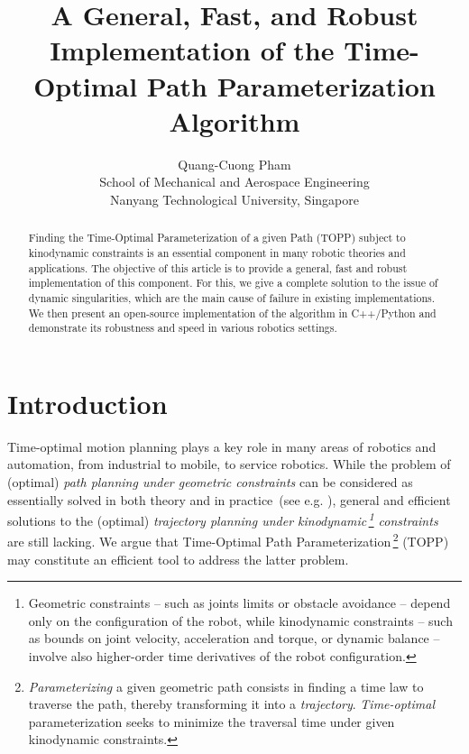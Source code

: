 \documentclass[9pt,technote]{IEEEtran}
\title{A General, Fast, and Robust Implementation of the Time-Optimal
  Path Parameterization Algorithm}
\author{Quang-Cuong Pham\\ 
  School of Mechanical and Aerospace
  Engineering\\ 
  Nanyang Technological University, Singapore}
\begin{document}
\maketitle
\thispagestyle{empty}
\pagestyle{empty}

\begin{abstract}
  Finding the Time-Optimal Parameterization of a given Path (TOPP)
  subject to kinodynamic constraints is an essential component in many
  robotic theories and applications. The objective of this article is
  to provide a general, fast and robust implementation of this
  component. For this, we give a complete solution to the issue of
  dynamic singularities, which are the main cause of failure in
  existing implementations. We then present an open-source
  implementation of the algorithm in C++/Python and demonstrate its
  robustness and speed in various robotics settings.
\end{abstract}


\section{Introduction}
\label{sec:intro}

Time-optimal motion planning plays a key role in many areas of
robotics and automation, from industrial to mobile, to service
robotics. While the problem of (optimal) \emph{path planning under
  geometric constraints} can be considered as essentially solved in
both theory and in practice~(see e.g. \cite{Lav06book}), general and
efficient solutions to the (optimal) \emph{trajectory planning under
  kinodynamic\,\footnote{Geometric constraints -- such as joints
    limits or obstacle avoidance -- depend only on the configuration
    of the robot, while kinodynamic constraints -- such as bounds on
    joint velocity, acceleration and torque, or dynamic balance --
    involve also higher-order time derivatives of the robot
    configuration.}  constraints}~\cite{DonX93acm} are still
lacking. We argue that Time-Optimal Path
Parameterization\,\footnote{\emph{Parameterizing} a given geometric
  path consists in finding a time law to traverse the path, thereby
  transforming it into a \emph{trajectory}.  \emph{Time-optimal}
  parameterization seeks to minimize the traversal time under given
  kinodynamic constraints.} (TOPP) may constitute an efficient tool to
address the latter problem.
\end{document}
